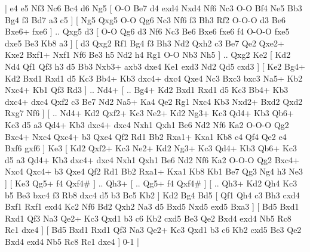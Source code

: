 \makegametitle 
|   e4   e5    Nf3   Nc6    Bc4   d6    Ng5 [  O-O Be7  d4 exd4  Nxd4 Nf6  Nc3 O-O  Bf4 Ne5  Bb3 Bg4  f3 Bd7  a3 c5   ]  [  Ng5 Qxg5  O-O Qg6  Nc3 Nf6  f3 Bh3  Rf2 O-O-O  d3 Be6  Bxe6+ fxe6   ] .. Qxg5    d3 [  O-O Qg6  d3 Nf6  Nc3 Be6  Bxe6 fxe6  f4 O-O-O  fxe5 dxe5  Be3 Kb8  a3   ]  [  d3 Qxg2  Rf1 Bg4  f3 Bh3  Nd2 Qxh2  c3 Be7  Qe2 Qxe2+  Kxe2 Bxf1+  Nxf1 Nf6  Be3 h5  Nd2 h4  Rg1 O-O  Nb3 Nh5   ] .. Qxg2    Ke2 [  Kd2 Nd4  Qf1 Qf3  h3 d5  Bb3 Nxb3+  axb3 dxe4  Ke1 exd3  Nd2 Qd5  cxd3   ]  [  Ke2 Bg4+  Kd2 Bxd1  Rxd1 d5  Kc3 Bb4+  Kb3 dxc4+  dxc4 Qxe4  Nc3 Bxc3  bxc3 Na5+  Kb2 Nxc4+  Kb1 Qf3  Rd3   ] .. Nd4+ [ .. Bg4+  Kd2 Bxd1  Rxd1 d5  Kc3 Bb4+  Kb3 dxc4+  dxc4 Qxf2  c3 Be7  Nd2 Na5+  Ka4 Qe2  Rg1 Nxc4  Kb3 Nxd2+  Bxd2 Qxd2  Rxg7 Nf6   ]  [ .. Nd4+  Kd2 Qxf2+  Kc3 Ne2+  Kd2 Ng3+  Kc3 Qd4+  Kb3 Qb6+  Kc3 d5  a3 Qd4+  Kb3 dxc4+  dxc4 Nxh1  Qxh1 Be6  Nd2 Nf6  Ka2 O-O-O  Qg2 Bxc4+  Nxc4 Qxc4+  b3 Qxe4  Qf2 Rd1  Bb2 Rxa1+  Kxa1 Kb8  c4 Qf4  Qe2 e4  Bxf6 gxf6   ]  Ke3 [  Kd2 Qxf2+  Kc3 Ne2+  Kd2 Ng3+  Kc3 Qd4+  Kb3 Qb6+  Kc3 d5  a3 Qd4+  Kb3 dxc4+  dxc4 Nxh1  Qxh1 Be6  Nd2 Nf6  Ka2 O-O-O  Qg2 Bxc4+  Nxc4 Qxc4+  b3 Qxe4  Qf2 Rd1  Bb2 Rxa1+  Kxa1 Kb8  Kb1 Be7  Qg3 Ng4  h3 Ne3   ]  [  Ke3 Qg5+  f4 Qxf4#   ] .. Qh3+ [ .. Qg5+  f4 Qxf4#   ]  [ .. Qh3+  Kd2 Qh4  Kc3 b5  Be3 bxc4  f3 Rb8  dxc4 d5  b3 Bc5  Kb2   ]  Kd2   Bg4    Bd5 [  Qf1 Qh4  c3 Bh3  cxd4 Bxf1  Rxf1 exd4  Kc2 Nf6  Bd2 Qxh2  Na3 d5  Bxd5 Nxd5  exd5 Bxa3   ]  [  Bd5 Bxd1  Rxd1 Qf3  Na3 Qe2+  Kc3 Qxd1  b3 c6  Kb2 cxd5  Be3 Qe2  Bxd4 exd4  Nb5 Rc8  Rc1 dxe4   ]  [  Bd5 Bxd1  Rxd1 Qf3  Na3 Qe2+  Kc3 Qxd1  b3 c6  Kb2 cxd5  Be3 Qe2  Bxd4 exd4  Nb5 Rc8  Rc1 dxe4   ] 0-1  |
